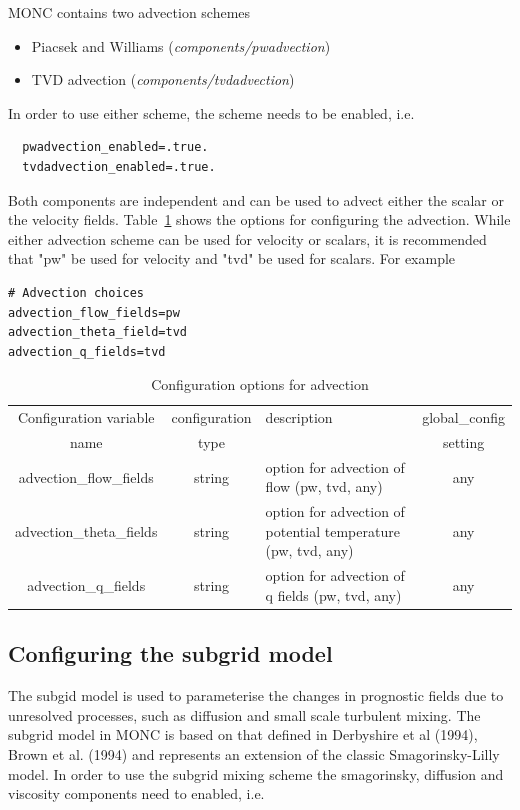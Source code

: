 \documentclass[a4paper,11pt]{article}
\begin{document}
MONC contains two advection schemes

\begin{itemize}
  \item {Piacsek and Williams (\emph{components/pwadvection})}
  \item {TVD advection (\emph{components/tvdadvection})}
\end{itemize}

In order to use either scheme, the scheme needs to be enabled, i.e.
\begin{lstlisting}
  pwadvection_enabled=.true.
  tvdadvection_enabled=.true.
\end{lstlisting}

Both components are independent and can be used to advect either the scalar
or the velocity fields. Table~\ref{tab:advection} shows the options for
configuring the advection. While either advection scheme can be used for velocity
or scalars, it is recommended that "pw" be used for velocity and "tvd" be used
for scalars. For example
\begin{lstlisting}[caption={Example configuration snippet for advection options
  from lanfex\_IOP1\_casim.mcf}]
# Advection choices
advection_flow_fields=pw
advection_theta_field=tvd
advection_q_fields=tvd
\end{lstlisting}

\begin{table}[H]
  \protect\caption{Configuration options for advection}
\label{tab:advection}
\begin{tabular}{|c|c|p{5cm}|c|}
\hline
Configuration variable & configuration & description & global\_config \tabularnewline
name & type & & setting \tabularnewline
\hline
\hline
  advection\_flow\_fields & string & option for advection of flow (pw, tvd, any)  & any \tabularnewline
 \hline
  advection\_theta\_fields & string & option for advection of potential temperature (pw, tvd, any)  & any \tabularnewline
\hline
  advection\_q\_fields & string & option for advection of q fields (pw, tvd, any) & any \tabularnewline
 \hline
 \hline
\end{tabular}
\end{table}

\subsection{Configuring the subgrid model}

The subgid model is used to parameterise the
changes in prognostic fields due to unresolved processes, such as diffusion and
small scale turbulent mixing. The subgrid model in MONC is based on that
defined in Derbyshire et al (1994), Brown et al. (1994) and represents an
extension of the classic Smagorinsky-Lilly model. In order to use the
subgrid mixing scheme the smagorinsky, diffusion and viscosity components need to
enabled, i.e.
\end{document}
